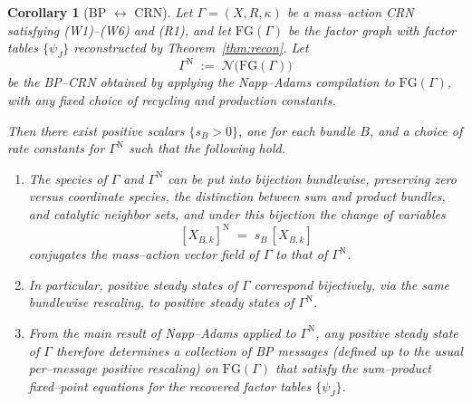 \documentclass{article}
\theoremstyle{plain}
\newtheorem{corollary}[theorem]{Corollary}
\theoremstyle{definition}
\theoremstyle{remark}
\newcommand{\<}{\langle}
\renewcommand{\>}{\rangle}
\begin{document}
\begin{corollary}[BP $\leftrightarrow$ CRN]\label{cor:roundtrip}
Let $\Gamma=(X,R,\kappa)$ be a mass--action CRN satisfying
\textup{(W1)--(W6)} and \textup{(R1)}, and let $\mathrm{FG}(\Gamma)$ be the
factor graph with factor tables $\{\psi_J\}$ reconstructed by
Theorem~\textup{\ref{thm:recon}}. Let
\[
  \Gamma^{\mathrm N} \;:=\; \mathcal N\bigl(\mathrm{FG}(\Gamma)\bigr)
\]
be the BP--CRN obtained by applying the Napp--Adams compilation to
$\mathrm{FG}(\Gamma)$, with any fixed choice of recycling and production
constants.

Then there exist positive scalars $\{s_B>0\}$, one for each bundle $B$, and
a choice of rate constants for $\Gamma^{\mathrm N}$ such that the following
hold.
\begin{enumerate}
  \item The species of $\Gamma$ and $\Gamma^{\mathrm N}$ can be put into
        bijection bundlewise, preserving zero versus coordinate species,
        the distinction between sum and product bundles, and catalytic
        neighbor sets, and under this bijection the change of variables
        \[
          [X_{B,k}]^{\mathrm N} \;=\; s_B\,[X_{B,k}]
        \]
        conjugates the mass--action vector field of $\Gamma$ to that of
        $\Gamma^{\mathrm N}$.

  \item In particular, positive steady states of $\Gamma$ correspond
        bijectively, via the same bundlewise rescaling, to positive steady
        states of $\Gamma^{\mathrm N}$.

  \item From the main result of Napp--Adams applied to
        $\Gamma^{\mathrm N}$, any positive steady state of $\Gamma$
        therefore determines a collection of BP messages (defined up to the
        usual per--message positive rescaling) on $\mathrm{FG}(\Gamma)$
        that satisfy the sum--product fixed--point equations for the
        recovered factor tables $\{\psi_J\}$.
\end{enumerate}
\end{corollary}
\end{document}
